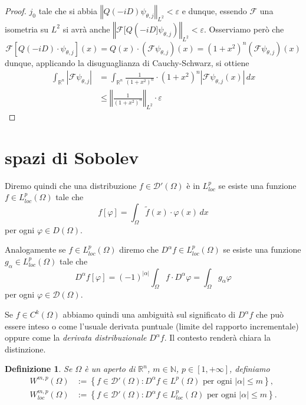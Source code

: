 \documentclass[italian,a4paper,oneside,headinclude]{scrbook}
\newcommand{\eps}{\varepsilon}
\renewcommand{\phi}{\varphi}
\newcommand{\loc}{\mathit{loc}}
\newcommand{\D}{\mathcal D}
\newcommand{\F}{\mathcal F}
\newcommand{\NN}{\mathbb N}
\newcommand{\RR}{\mathbb R}
\newcommand{\abs}[1]{{\left|#1\right|}}
\newcommand{\Abs}[1]{{\left\Vert #1\right\Vert}}
\newcommand{\defeq}{:=}
\newtheorem{definition}[theorem]{Definizione}
\begin{document}
\begin{proof}
  $j_0$ tale che si abbia $\Abs{Q(-iD)\psi_{\theta,j}}_{L^2}<\eps$
  e dunque, essendo $\F$ una isometria su $L^2$ si avrà anche
  $\Abs{\F[Q(-iD]\psi_{\theta,j})}_{L^2} < \eps$.
  Osserviamo però che
  \[
  \F[Q(-iD)\cdot \psi_{\theta,j}](x) = Q(x)\cdot (\F\psi_{\theta,j})(x)
  = (1+x^2)^n (\F\psi_{\theta,j})(x)
  \]
  dunque, applicando la disuguaglianza di Cauchy-Schwarz,
  si ottiene
  \begin{align*}
  \int_{\RR^n} \abs{\F\psi_{\theta,j}}
  &= \int_{\RR^n} \frac{1}{(1+x^2)^n}\cdot
  (1+x^2)^n\abs{\F\psi_{\theta,j}(x)}\, dx \\
  &\le \Abs{\frac{1}{(1+x^2)^n}}_{L^2}\cdot
  \eps
  \end{align*}
  \end{proof}

  \section{spazi di Sobolev}

  Diremo quindi che una distribuzione $f\in\D'(\Omega)$
  è in $L^p_\loc$
  se esiste una funzione $f\in L^p_\loc(\Omega)$ tale che
  \[
  f[\phi] = \int_\Omega \tilde f(x) \cdot \phi(x)\, dx
  \]
  per ogni $\phi \in D(\Omega)$.

  Analogamente se $f\in L^p_\loc(\Omega)$ diremo che
  $D^\alpha f \in L^p_\loc(\Omega)$ se esiste una funzione
  $g_\alpha \in L^p_\loc(\Omega)$ tale che
  \[
  D^\alpha f[\phi] = (-1)^{\abs{\alpha}}  \int_\Omega f\cdot  D^\alpha \phi
  = \int_\Omega g_\alpha \phi
  \]
  per ogni $\phi\in \D(\Omega)$.

  Se $f\in C^k(\Omega)$ abbiamo quindi una ambiguità sul significato
  di $D^\alpha f$ che può essere inteso o come l'usuale derivata
  puntuale (limite del rapporto incrementale) oppure come la
  \emph{derivata distribuzionale} $D^\alpha f$. Il contesto
  renderà chiara la distinzione.

  \begin{definition}
    Se $\Omega$ è un aperto di $\RR^n$, $m\in \NN$, $p\in [1,+\infty]$,
    definiamo
    \begin{align*}
      W^{m,p}(\Omega)
      &\defeq \left\{ f\in \D'(\Omega)\colon D^\alpha
    f \in L^p(\Omega)\text{ per ogni $\abs{\alpha}\le
      m$}\right\},\\
      W^{m,p}_\loc(\Omega)
      &\defeq \left\{ f\in \D'(\Omega)\colon D^\alpha
    f \in L^p_\loc(\Omega)\text{ per ogni $\abs{\alpha}\le
      m$}\right\}.
    \end{align*}
  \end{definition}
\end{document}
